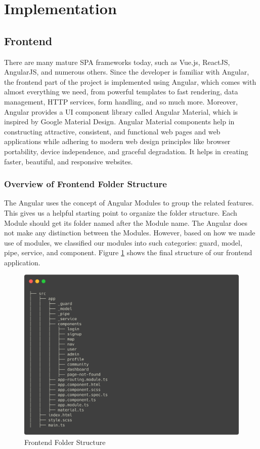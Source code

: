 \section{Implementation}
\label{sec:Implementation}

\subsection{Frontend}
There are many mature SPA frameworks today, such as Vue.js, ReactJS, AngularJS, and numerous others. Since the developer is familiar with Angular, the frontend part of the project is implemented using Angular, which comes with almost everything we need, from powerful templates to fast rendering, data management, HTTP services, form handling, and so much more. Moreover, Angular provides a UI component library called Angular Material,
which is inspired by Google Material Design. Angular Material components help in constructing attractive, consistent, and functional web pages and web applications while adhering to modern web design principles like browser portability, device independence, and graceful degradation. It helps in creating faster, beautiful, and responsive websites.

\subsubsection{Overview of Frontend Folder Structure}
The Angular uses the concept of Angular Modules to group the related features. This gives us a helpful starting point to organize the folder structure. Each Module should get its folder named after the Module name. The Angular does not make any distinction between the Modules. However, based on how we made use of modules, we classified our modules into such categories: guard, model, pipe, service, and component. Figure \ref{fig:Frontend Folder Structure} shows the final structure of our frontend application.

\begin{figure}[htbp]
  \centering
  \includegraphics[width=\textwidth]{section04/assets/Frontend.png}
  \caption{Frontend Folder Structure}
  \label{fig:Frontend Folder Structure}
\end{figure}

